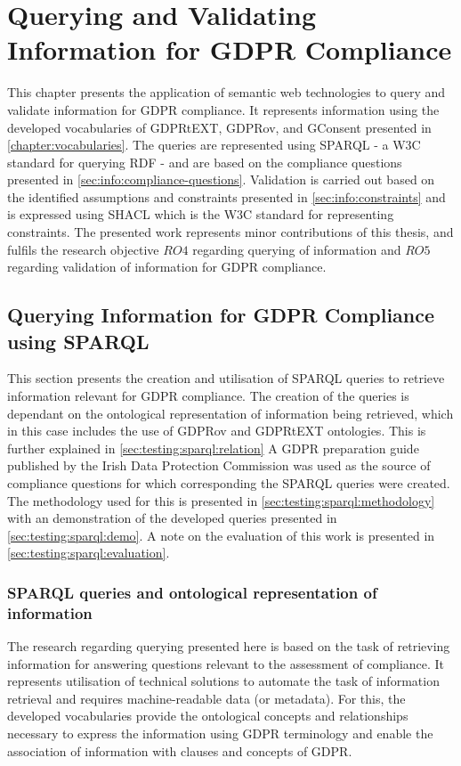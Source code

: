 \chapter{Querying and Validating Information for GDPR Compliance}
\label{chapter:testing}
This chapter presents the application of semantic web technologies to query and validate information for GDPR compliance.
It represents information using the developed vocabularies of GDPRtEXT, GDPRov, and GConsent presented in \autoref{chapter:vocabularies}.
The queries are represented using SPARQL - a W3C standard for querying RDF - and are based on the compliance questions presented in \autoref{sec:info:compliance-questions}.
Validation is carried out based on the identified assumptions and constraints presented in \autoref{sec:info:constraints} and is expressed using SHACL which is the W3C standard for representing constraints.
The presented work represents minor contributions of this thesis, and fulfils the research objective $RO4$ regarding querying of information and $RO5$ regarding validation of information for GDPR compliance.

\section{Querying Information for GDPR Compliance using SPARQL}\label{sec:testing:sparql}
This section presents the creation and utilisation of SPARQL queries to retrieve information relevant for GDPR compliance.
The creation of the queries is dependant on the ontological representation of information being retrieved, which in this case includes the use of GDPRov and GDPRtEXT ontologies. This is further explained in \autoref{sec:testing:sparql:relation}
A GDPR preparation guide published by the Irish Data Protection Commission was used as the source of compliance questions for which corresponding the SPARQL queries were created. The methodology used for this is presented in \autoref{sec:testing:sparql:methodology} with an demonstration of the developed queries presented in \autoref{sec:testing:sparql:demo}.
A note on the evaluation of this work is presented in \autoref{sec:testing:sparql:evaluation}.

\subsection{SPARQL queries and ontological representation of information}\label{sec:testing:sparql:relation}
The research regarding querying presented here is based on the task of retrieving information for answering questions relevant to the assessment of compliance.
It represents utilisation of technical solutions to automate the task of information retrieval and requires machine-readable data (or metadata).
For this, the developed vocabularies provide the ontological concepts and relationships necessary to express the information using GDPR terminology and enable the association of information with clauses and concepts of GDPR.

